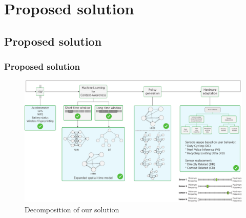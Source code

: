 \documentclass[compress,9pt,xcolor={dvipsnames,table}]{beamer}
\begin{document}
\section{Proposed solution}
\subsection{Proposed solution}
\begin{frame}[t]\frametitle{Proposed solution}
\begin{figure}[tb]
  \centering
  \includegraphics[width=\textwidth]{../../../resources/images/vectors/dual-taxonomy-ours}
  \caption{Decomposition of our solution}
  \label{fig:dual-taxonomy-ours}
  \end{figure}

\end{frame}
\end{document}
